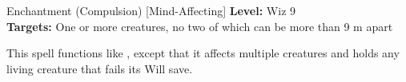 {Enchantment (Compulsion) [Mind-Affecting]}
{
	\textbf{Level:}
	Wiz 9\\
	\textbf{Targets:}
	One or more creatures, no two of which can be more than 9 m apart\\
}
{
	This spell functions like , except that it affects multiple creatures and holds any living creature that fails its Will save.

}
